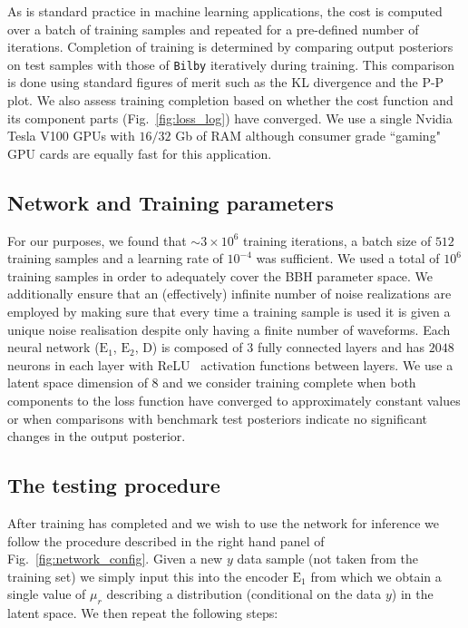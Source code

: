 \documentclass[%
showpacs,
 amsmath,amssymb,
 aps,
 twocolumn,
 prl,
 reprint,
floatfix,
]{revtex4-1}
\newcommand{\chris}[1]{\textbf{\textcolor{red}{CHRIS: #1}}}
\begin{document}
%
%
As is standard practice in machine learning applications, the cost is computed
over a batch of training samples and repeated for a pre-defined number of
iterations. Completion of training is determined by comparing output posteriors
on test samples with those of \texttt{Bilby} iteratively during training. This
comparison is done using standard figures of merit such as the \ac{KL}
divergence and the P-P plot. We also assess training completion based on
whether the cost function and its component parts (Fig.~\ref{fig:loss_log})
have converged. We use a single Nvidia Tesla V100 \acp{GPU} with $16/32$ Gb of
RAM although consumer grade ``gaming" \ac{GPU} cards are equally fast for this
application.


\subsection{Network and Training parameters}
%
%
For our purposes, we found that $\sim3\times10^6$ training iterations, a batch
size of $512$ training samples and a learning rate of $10^{-4}$ was sufficient.
We used a total of $10^6$ training samples in order to adequately cover the
\ac{BBH} parameter space. We additionally ensure that an (effectively) infinite
number of noise realizations are employed by making sure that every time a
training sample is used it is given a unique noise realisation despite only
having a finite number of waveforms. Each neural network ($\text{E}_1$,
$\text{E}_2$, D) is composed of 3 fully connected layers and has $2048$ neurons
in each layer with ReLU~\cite{nair2010rectified} activation functions between
layers. We use a latent space dimension of $8$ and we consider training
complete when both components to the loss function have converged to
approximately constant values or when comparisons with benchmark test
posteriors indicate no significant changes in the output posterior.

\subsection{The testing procedure}
%
%
%
After training has completed and we wish to use the network for inference we
follow the procedure described in the right hand panel of
Fig.~\ref{fig:network_config}. Given a new $y$ data sample (not taken from the
training set) we simply input this into the encoder $\textrm{E}_1$ from which we
obtain a single value of $\mu_{r}$ describing a distribution (conditional on the
data $y$) in the latent space. We then repeat the following steps:
\end{document}
